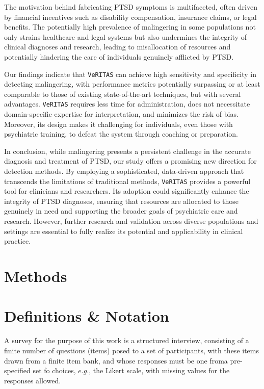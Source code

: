 \documentclass[onecolumn,10pt]{IEEEtran}
\def\vrts{\texttt{VeRITAS}\xspace}
\begin{document}
The motivation behind fabricating PTSD symptoms is multifaceted, often driven by financial incentives such as disability compensation, insurance claims, or legal benefits. %
The potentially high prevalence of malingering in some populations not only strains healthcare and legal systems but also undermines the integrity of clinical diagnoses and research, leading to misallocation of resources and potentially hindering the care of individuals genuinely afflicted by PTSD.

Our findings indicate that \vrts can achieve high sensitivity and specificity in detecting malingering, with performance metrics potentially surpassing or at least comparable to those of existing state-of-the-art techniques, but with several advantages. \vrts requires less time for administration, does not necessitate domain-specific expertise for interpretation, and minimizes the risk of bias. Moreover, its design makes it challenging for individuals, even those with psychiatric training, to defeat the system through coaching or preparation.

In conclusion, while malingering presents a persistent challenge in the accurate diagnosis and treatment of PTSD, our study offers a promising new direction for detection methods. By employing a sophisticated, data-driven approach that transcends the limitations of traditional methods, \vrts provides a powerful tool for clinicians and researchers. Its adoption could significantly enhance the integrity of PTSD diagnoses, ensuring that resources are allocated to those genuinely in need and supporting the broader goals of psychiatric care and research. However, further research and validation across diverse populations and settings are essential to fully realize its potential and applicability in clinical practice.

\section*{Methods}
\section{Definitions \& Notation}

\begin{defn}[Survey]
  A survey for the purpose of this work is a structured interview, consisting of a finite number of questions (items) posed to a set of participants, with these items drawn from a finite item bank, and  whose responses must be one froma pre-specified set fo choices, $e.g.$, the Likert scale, with missing values for the responses allowed. 
\end{defn}
\end{document}
